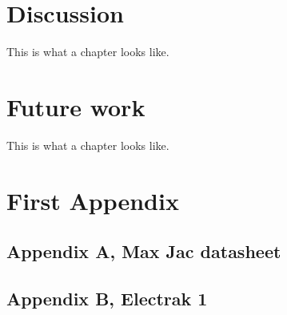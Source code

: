 \documentclass[a4paper,11pt]{kth-mag}
\begin{document}
\chapter{Discussion}
This is what a chapter looks like.

\chapter{Future work}
This is what a chapter looks like.





\appendix
\addappheadtotoc
\chapter{First Appendix}
\section{Appendix A, Max Jac datasheet}

\section{Appendix B, Electrak 1}


\glsaddall
\end{document}
